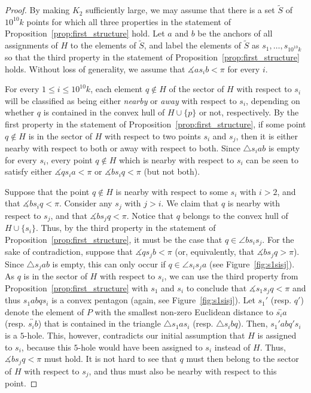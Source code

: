 \documentclass[12pt,reqno, a4paper]{amsart}
\begin{document}
\begin{proof} By making $K_2$ sufficiently large, we may assume that there is a set $\tilde{S}$ of $10^{10}k$ points for which all three properties in the statement of Proposition~\ref{prop:first_structure} hold. Let $a$ and $b$ be the anchors of all assignments of $H$ to the elements of $\tilde S$, and label the elements of $\tilde S$ as $s_1,\dots,s_{10^{10}k}$ so that the third property in the statement of Proposition~\ref{prop:first_structure} holds. Without loss of generality, we assume that $\measuredangle as_ib<\pi$ for every $i$. 

For every $1\leq i\leq 10^{10}k$, each element $q\not\in H$ of the sector of $H$ with respect to $s_i$ will be classified as being either \textit{nearby} or \textit{away} with respect to $s_i$, depending on whether $q$ is contained in the convex hull of $H\cup\{p\}$ or not, respectively. By the first property in the statement of Proposition~\ref{prop:first_structure}, if some point $q\notin H$ is in the sector of $H$ with respect to two points $s_i$ and $s_j$, then it is either nearby with respect to both or away with respect to both. Since $\triangle s_iab$ is empty for every $s_i$, every point $q\notin H$ which is nearby with respect to $s_i$ can be seen to satisfy either $\measuredangle qs_ia<\pi$ or $\measuredangle bs_iq<\pi$ (but not both).

Suppose that the point $q\notin H$ is nearby with respect to some $s_i$ with $i>2$, and that $\measuredangle bs_iq<\pi$. Consider any $s_j$ with $j>i$. We claim that $q$ is nearby with respect to $s_j$, and that $\measuredangle bs_jq<\pi$. Notice that $q$ belongs to the convex hull of $H\cup\{s_i\}$. Thus, by the third property in the statement of Proposition~\ref{prop:first_structure}, it must be the case that $q\in\angle bs_is_j$. For the sake of contradiction, suppose that $\measuredangle qs_jb<\pi$ (or, equivalently, that $\measuredangle bs_jq>\pi$). Since $\triangle s_jab$ is empty, this can only occur if $q\in\angle s_is_ja$ (see Figure~\ref{fig:s1sisj}). As $q$ is in the sector of $H$ with respect to $s_i$, we can use the third property from Proposition~\ref{prop:first_structure} with $s_1$ and $s_i$ to conclude that $\measuredangle s_1s_jq<\pi$ and thus $s_1abqs_i$ is a convex pentagon (again, see Figure~\ref{fig:s1sisj}). Let $s_1'$ (resp. $q'$) denote the element of $P$ with the smallest non-zero Euclidean distance to $\overleftrightarrow{s_ia}$ (resp. $\overleftrightarrow{s_ib}$) that is contained in the triangle $\triangle s_1as_i$ (resp. $\triangle s_ibq$). Then, $s_1'abq's_i$ is a $5$-hole. This, however, contradicts our initial assumption that $H$ is assigned to $s_i$, because this $5$-hole would have been assigned to $s_i$ instead of $H$. Thus, $\measuredangle bs_jq<\pi$ must hold. It is not hard to see that $q$ must then belong to the sector of $H$ with respect to $s_j$, and thus must also be nearby with respect to this point. 


\end{proof}
\end{document}
